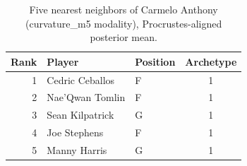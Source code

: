 \begin{table}[htbp]
  \centering\small
  \begin{tabular}{rllc}
    \toprule
    Rank & Player & Position & Archetype \\
    \midrule
    1 & Cedric Ceballos & F & 1 \\
    2 & Nae'Qwan Tomlin & F & 1 \\
    3 & Sean Kilpatrick & G & 1 \\
    4 & Joe Stephens & F & 1 \\
    5 & Manny Harris & G & 1 \\
    \bottomrule
  \end{tabular}
  \caption{Five nearest neighbors of Carmelo Anthony (curvature_m5 modality), Procrustes-aligned posterior mean.}
  \label{tab:Carmelo_Anthony_neighbors_curvature_m5}
\end{table}

